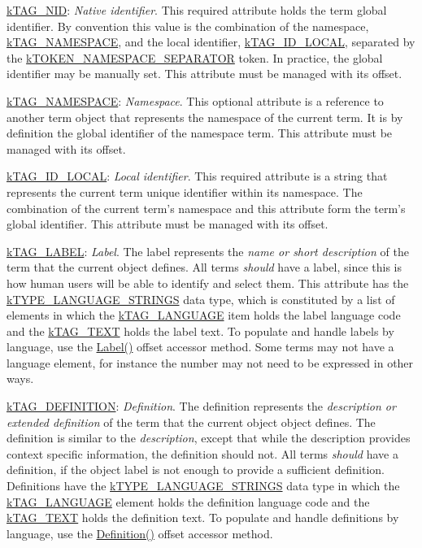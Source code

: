 \begin{DoxyItemize}
\item {\ttfamily \hyperlink{}{k\-T\-A\-G\-\_\-\-N\-I\-D}}\-: {\itshape Native identifier}. This required attribute holds the term global identifier. By convention this value is the combination of the namespace, \hyperlink{}{k\-T\-A\-G\-\_\-\-N\-A\-M\-E\-S\-P\-A\-C\-E}, and the local identifier, \hyperlink{}{k\-T\-A\-G\-\_\-\-I\-D\-\_\-\-L\-O\-C\-A\-L}, separated by the \hyperlink{}{k\-T\-O\-K\-E\-N\-\_\-\-N\-A\-M\-E\-S\-P\-A\-C\-E\-\_\-\-S\-E\-P\-A\-R\-A\-T\-O\-R} token. In practice, the global identifier may be manually set. This attribute must be managed with its offset. 
\item {\ttfamily \hyperlink{}{k\-T\-A\-G\-\_\-\-N\-A\-M\-E\-S\-P\-A\-C\-E}}\-: {\itshape Namespace}. This optional attribute is a reference to another term object that represents the namespace of the current term. It is by definition the global identifier of the namespace term. This attribute must be managed with its offset. 
\item {\ttfamily \hyperlink{}{k\-T\-A\-G\-\_\-\-I\-D\-\_\-\-L\-O\-C\-A\-L}}\-: {\itshape Local identifier}. This required attribute is a string that represents the current term unique identifier within its namespace. The combination of the current term's namespace and this attribute form the term's global identifier. This attribute must be managed with its offset. 
\item {\ttfamily \hyperlink{}{k\-T\-A\-G\-\_\-\-L\-A\-B\-E\-L}}\-: {\itshape Label}. The label represents the {\itshape name or short description} of the term that the current object defines. All terms {\itshape should} have a label, since this is how human users will be able to identify and select them. This attribute has the \hyperlink{}{k\-T\-Y\-P\-E\-\_\-\-L\-A\-N\-G\-U\-A\-G\-E\-\_\-\-S\-T\-R\-I\-N\-G\-S} data type, which is constituted by a list of elements in which the \hyperlink{}{k\-T\-A\-G\-\_\-\-L\-A\-N\-G\-U\-A\-G\-E} item holds the label language code and the \hyperlink{}{k\-T\-A\-G\-\_\-\-T\-E\-X\-T} holds the label text. To populate and handle labels by language, use the \hyperlink{}{Label()} offset accessor method. Some terms may not have a language element, for instance the number {} may not need to be expressed in other ways. 
\item {\ttfamily \hyperlink{}{k\-T\-A\-G\-\_\-\-D\-E\-F\-I\-N\-I\-T\-I\-O\-N}}\-: {\itshape Definition}. The definition represents the {\itshape description or extended definition} of the term that the current object object defines. The definition is similar to the {\itshape description}, except that while the description provides context specific information, the definition should not. All terms {\itshape should} have a definition, if the object label is not enough to provide a sufficient definition. Definitions have the \hyperlink{}{k\-T\-Y\-P\-E\-\_\-\-L\-A\-N\-G\-U\-A\-G\-E\-\_\-\-S\-T\-R\-I\-N\-G\-S} data type in which the \hyperlink{}{k\-T\-A\-G\-\_\-\-L\-A\-N\-G\-U\-A\-G\-E} element holds the definition language code and the \hyperlink{}{k\-T\-A\-G\-\_\-\-T\-E\-X\-T} holds the definition text. To populate and handle definitions by language, use the \hyperlink{}{Definition()} offset accessor method. 

\end{DoxyItemize}
